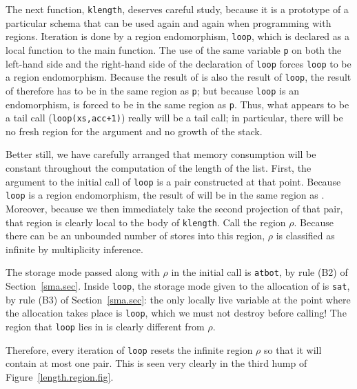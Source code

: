 \documentclass[12pt]{book}
\begin{document}
The next function, {\tt klength}, deserves careful study, because
it is a prototype of a particular schema
that can be used again and again when programming with
regions. Iteration is done by a region endomorphism,
{\tt loop}, which is
declared as a local function to the main function. The use of
the same variable {\tt p} on both the left-hand side and the right-hand
side of the declaration of {\tt loop} forces {\tt loop} to be a region
endomorphism. Because the result of 
 is also the result of {\tt loop}, the
result of  therefore has to be in the same region as {\tt p};
but because {\tt loop} is an endomorphism, 
 is forced to be in the same region as {\tt p}.
Thus, what appears to be a tail call ({\tt loop(xs,acc+1)})
really will be a tail call; in particular, there will be no fresh region
for the argument and no growth
of the stack. 

Better still, we have carefully arranged that
memory consumption will be constant throughout the computation of
the length of the list. First, the argument to the 
initial call of {\tt loop} is a pair  constructed
at that point. Because {\tt loop} is a region endomorphism, the
result of  will be in the same region as .
Moreover, because we then immediately take the second projection of
that pair, that region is clearly local to the body of {\tt klength}.
Call the region  $\rho$. Because there can be an unbounded number of stores into
this region, $\rho$ is classified as infinite by multiplicity inference.

The storage mode passed along with $\rho$ in the initial call
 is {\tt atbot}, by rule (B2) of
Section~\ref{sma.sec}. Inside {\tt loop}, the storage mode given to
the allocation of  is {\tt sat}, by rule (B3) of
Section~\ref{sma.sec}: the only locally live variable at the point
where the allocation takes place is {\tt loop}, which we must not
destroy before calling! The region that {\tt loop} lies in is
clearly different from $\rho$.

Therefore, every iteration of {\tt loop} resets the infinite region
$\rho$ so that it will contain at most one pair.  This is seen very
clearly in the third hump of Figure~\ref{length.region.fig}.
\end{document}
